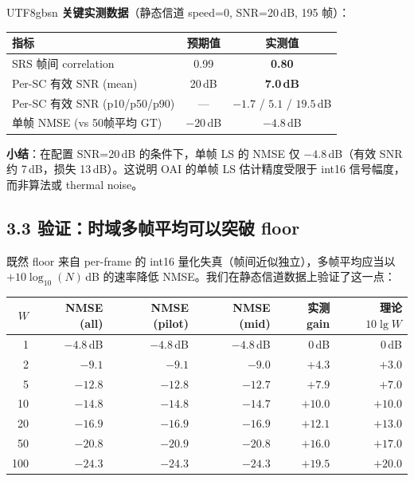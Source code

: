 \documentclass[11pt,a4paper]{article}
\begin{document}
\begin{CJK}{UTF8}{gbsn}
\textbf{关键实测数据}（静态信道 speed=0, SNR=20\,dB, 195 帧）：

\begin{table}[h]\centering
\begin{tabular}{lcc}
\toprule
指标 & 预期值 & 实测值 \\
\midrule
SRS 帧间 correlation & 0.99 & \textbf{0.80} \\
Per-SC 有效 SNR (mean) & 20\,dB & \textbf{7.0\,dB} \\
Per-SC 有效 SNR (p10/p50/p90) & --- & $-1.7$ / $5.1$ / $19.5$\,dB \\
单帧 NMSE (vs 50帧平均 GT) & $-20$\,dB & $\mathbf{-4.8}$\,dB \\
\bottomrule
\end{tabular}
\end{table}

\textbf{小结}：在配置 SNR=20\,dB 的条件下，单帧 LS 的 NMSE 仅 $-4.8$\,dB（有效 SNR 约 7\,dB，损失 13\,dB）。这说明 OAI 的单帧 LS 估计精度受限于 int16 信号幅度，而非算法或 thermal noise。

\subsection{3.3 验证：时域多帧平均可以突破 floor}

既然 floor 来自 per-frame 的 int16 量化失真（帧间近似独立），多帧平均应当以 $+10\log_{10}(N)$\,dB 的速率降低 NMSE。我们在静态信道数据上验证了这一点：

\begin{table}[h]\centering
\begin{tabular}{rrrrrr}
\toprule
$W$ & NMSE (all) & NMSE (pilot) & NMSE (mid) & 实测 gain & 理论 $10\lg W$ \\
\midrule
1 & $-4.8$\,dB & $-4.8$\,dB & $-4.8$\,dB & 0\,dB & 0\,dB \\
2 & $-9.1$ & $-9.1$ & $-9.0$ & $+4.3$ & $+3.0$ \\
5 & $-12.8$ & $-12.8$ & $-12.7$ & $+7.9$ & $+7.0$ \\
10 & $-14.8$ & $-14.8$ & $-14.7$ & $+10.0$ & $+10.0$ \\
20 & $-16.9$ & $-16.9$ & $-16.9$ & $+12.1$ & $+13.0$ \\
50 & $-20.8$ & $-20.9$ & $-20.8$ & $+16.0$ & $+17.0$ \\
100 & $-24.3$ & $-24.3$ & $-24.3$ & $+19.5$ & $+20.0$ \\
\bottomrule
\end{tabular}
\end{table}


\end{CJK}
\end{document}
